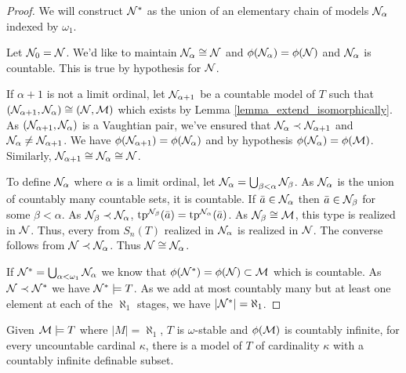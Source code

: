 \begin{proof}
We will construct \(\mathcal{N}^*\) as the union of an elementary chain of models \(\mathcal{N}_\alpha\) indexed by \(\omega_1\).

Let \(\mathcal{N}_0 = \mathcal{N}\). 
We'd like to maintain \(\mathcal{N}_\alpha \cong \mathcal{N}\) and \(\phi(\mathcal{N}_\alpha) = \phi(\mathcal{N})\) and \(\mathcal{N}_\alpha\) is countable. 
This is true by hypothesis for \(\mathcal{N}\).

If \(\alpha + 1\) is not a limit ordinal, let \(\mathcal{N}_{\alpha + 1}\) be a countable model of \(T\) such that \((\mathcal{N}_{\alpha+1}, \mathcal{N}_\alpha) \cong (\mathcal{N}, \mathcal{M})\) which exists by Lemma \ref{lemma_extend_isomorphically}. 
As \((\mathcal{N}_{\alpha+1}, \mathcal{N}_\alpha)\) is a Vaughtian pair, we've ensured that \(\mathcal{N}_\alpha \prec \mathcal{N}_{\alpha+1}\) and \(\mathcal{N}_\alpha \neq \mathcal{N}_{\alpha+1}\).
We have \(\phi(\mathcal{N}_{\alpha + 1}) = \phi(\mathcal{N}_\alpha)\) and by hypothesis \(\phi(\mathcal{N}_\alpha) = \phi(\mathcal{M})\). 
Similarly,  \(\mathcal{N}_{\alpha+1} \cong \mathcal{N}_\alpha \cong \mathcal{N}\). 

To define \(\mathcal{N}_\alpha\) where \(\alpha\) is a limit ordinal, let \(\mathcal{N}_\alpha = \bigcup_{\beta < \alpha}\mathcal{N}_\beta\). 
As \(\mathcal{N}_\alpha\) is the union of countably many countable sets, it is countable. 
If \(\bar{a} \in \mathcal{N}_\alpha\) then \(\bar{a} \in \mathcal{N}_\beta\) for some \(\beta < \alpha\). 
As \(\mathcal{N}_\beta \prec \mathcal{N}_\alpha\), \(\text{tp}^{\mathcal{N}_\beta}(\bar{a}) = \text{tp}^{\mathcal{N}_\alpha}(\bar{a})\). 
As \(\mathcal{N}_\beta \cong \mathcal{M}\), this type is realized in \(\mathcal{N}\).
Thus, every from \(S_n(T)\) realized in \(\mathcal{N}_\alpha\) is realized in \(\mathcal{N}\). 
The converse follows from \(\mathcal{N} \prec \mathcal{N}_\alpha\). 
Thus \(\mathcal{N} \cong \mathcal{N}_\alpha\).

If \(\mathcal{N}^* = \bigcup_{\alpha < \omega_1}\mathcal{N}_\alpha\) we know that \(\phi(\mathcal{N}^*) = \phi(\mathcal{N}) \subset \mathcal{M}\) which is countable.
As \(\mathcal{N} \prec \mathcal{N}^*\) we have \(\mathcal{N}^* \models T\).  
As we add at most countably many but at least one element at each of the \(\aleph_1\) stages, we have \(|\mathcal{N}^*| = \aleph_1\).
\end{proof}

\begin{theorem}\label{theorem_uncountable_vaughtian_pairs}
Given \(\mathcal{M} \models T\) where \(|M| = \aleph_1\), \(T\) is \(\omega\)-stable and \(\phi(\mathcal{M})\) is countably infinite, for every uncountable cardinal \(\kappa\), there is a model of \(T\) of cardinality \(\kappa\) with a countably infinite definable subset.  
\end{theorem}

